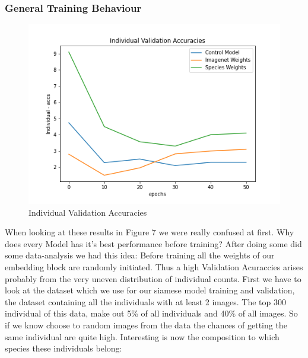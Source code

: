 \subsubsection{General Training Behaviour}

\begin{figure}[ht] 
        \centering \includegraphics[width=1\columnwidth]{figures/sieamesevalacc.png}
        \caption{\label{fig:sialoss} Individual Validation Accuracies}
\end{figure}When looking at these results in Figure 7 we were really confused at first. Why does every Model has it's best performance before training? After doing some did some data-analysis we had this idea: Before training all the weights of our embedding block are randomly initiated. Thus a high Validation Acuraccies arises probably from the very uneven distribution of individual counts. First we have to look at the dataset which we use for our siamese model training and validation, the dataset containing all the individuals with at least 2 images. The top 300 individual of this data, make out 5\% of all individuals and 40\% of all images. So if we know choose to random images from the data the chances of getting the same individual are quite high.
Interesting is now the composition to which species these individuals belong:
